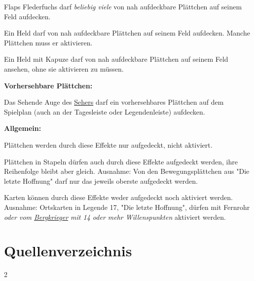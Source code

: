 \documentclass[10pt, a4paper, oneside]{book}
\newcommand{\fan}[1]{\textit{#1}}
\begin{document}
\bullet{} Flaps Flederfuchs darf \fan{beliebig viele} von nah aufdeckbare Plättchen auf seinem Feld aufdecken.
\supercite{DeK:Begleitheft,DfL:Begleitheft}

\bullet{} Ein Held darf von nah aufdeckbare Plättchen auf seinem Feld aufdecken. Manche Plättchen muss er aktivieren.

\bullet{} Ein Held mit Kapuze darf von nah aufdeckbare Plättchen auf seinem Feld ansehen, ohne sie aktivieren zu müssen.
\supercite{DlH:Ausrüstungstafel}
\bigskip


\textbf{Vorhersehbare Plättchen:}

\bullet{} Das Sehende Auge des \hyperref[Seher]{Sehers} darf ein vorhersehbares Plättchen auf dem Spielplan (auch an der Tagesleiste oder Legendenleiste) aufdecken.
\bigskip


\textbf{Allgemein:}

\bullet{} Plättchen werden durch diese Effekte nur aufgedeckt, nicht aktiviert.

\bullet{} Plättchen in Stapeln dürfen auch durch diese Effekte aufgedeckt werden, ihre Reihenfolge bleibt aber gleich.
\supercite{BL_BdM:A3_en}
Ausnahme: Von den Bewegungsplättchen aus "Die letzte Hoffnung" darf nur das jeweils oberste aufgedeckt werden.
\supercite{DH:Begleitheft}

\bullet{} Karten können durch diese Effekte weder aufgedeckt noch aktiviert werden. Ausnahme: Ortskarten in Legende 17, "Die letzte Hoffnung", dürfen mit Fernrohr \fan{oder vom \hyperref[Bergkrieger]{Bergkrieger} mit 14 oder mehr Willenspunkten} aktiviert werden.
\bigskip






\newpage
\chapter{Quellenverzeichnis}
\label{Quellen}

\begin{multicols*}{2}\raggedcolumns
    \setlength\bibitemsep{1pt}
    \renewcommand*{\bibfont}{\fontsize{6}{6}\selectfont}
    \printbibliography[heading=none]
\end{multicols*}












\newpage
\end{document}
